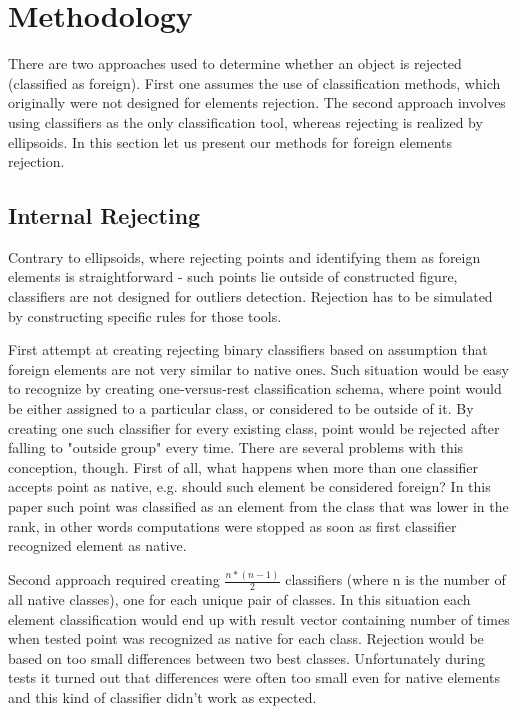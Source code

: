\documentclass{llncs}
\begin{document}
\section{Methodology}
  \label{sec:Methodology}
  
There are two approaches used to determine whether an object is rejected (classified as foreign). First one assumes the use of classification methods, which originally were not designed for elements rejection. The second approach involves using classifiers as the only classification tool, whereas rejecting is realized by ellipsoids. In this section let us present our methods for foreign elements rejection.

\subsection{Internal Rejecting}
  \label{subsec:InternalRejecting}

Contrary to ellipsoids, where rejecting points and identifying them as foreign elements is straightforward - such points lie outside of constructed figure, classifiers are not designed for outliers detection. Rejection has to be simulated by constructing specific rules for those tools.

First attempt at creating rejecting binary classifiers based on assumption that foreign elements are not very similar to native ones. Such situation would be easy to recognize by creating one-versus-rest classification schema, where point would be either assigned to a particular class, or considered to be outside of it. By creating one such classifier for every existing class, point would be rejected after falling to "outside group" every time. There are several problems with this conception, though. First of all, what happens when more than one classifier accepts point as native, e.g. should such element be considered foreign? In this paper such point was classified as an element from the class that was lower in the rank, in other words computations were stopped as soon as first classifier recognized element as native.

Second approach required creating $\frac{n * (n-1)}{2}$ classifiers (where n is the number of all native classes), one for each unique pair of classes. In this situation each element classification would end up with result vector containing number of times when tested point was recognized as native for each class. Rejection would be based on too small differences between two best classes. Unfortunately during tests it turned out that differences were often too small even for native elements and this kind of classifier didn't work as expected.
\end{document}
